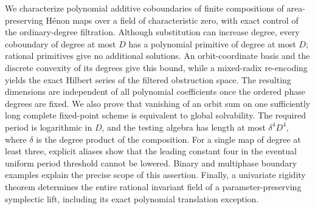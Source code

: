 We characterize polynomial additive coboundaries of finite compositions of
area-preserving H\'enon maps over a field of characteristic zero, with exact
control of the ordinary-degree filtration. Although substitution can increase
degree, every coboundary of degree at most $D$ has a polynomial primitive of
degree at most $D$; rational primitives give no additional solutions. An
orbit-coordinate basis and the discrete convexity of its degrees give this
bound, while a mixed-radix re-encoding yields the exact Hilbert series of the
filtered obstruction space. The resulting dimensions are independent of all
polynomial coefficients once the ordered phase degrees are fixed. We also prove
that vanishing of an orbit sum on one sufficiently long complete fixed-point
scheme is equivalent to global solvability. The required period is logarithmic
in $D$, and the testing algebra has length at most $\delta^4D^4$, where
$\delta$ is the degree product of the composition. For a single map of degree
at least three, explicit aliases show that the leading constant four in the
eventual uniform period threshold cannot be lowered. Binary and multiphase
boundary examples explain the precise scope of this assertion. Finally, a
univariate rigidity theorem determines the entire rational invariant field of
a parameter-preserving symplectic lift, including its exact polynomial
translation exception.
